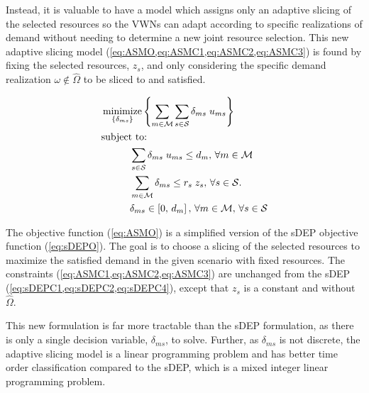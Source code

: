 \documentclass[12pt,dvipsnames]{report}
\DeclareMathOperator*{\argmin}{minimize}
\begin{document}
Instead, it is valuable to have a model which assigns only an adaptive slicing of the selected resources so the VWNs can adapt according to specific realizations of demand without needing to determine a new joint resource selection.  This new adaptive slicing model (\cref{eq:ASMO,eq:ASMC1,eq:ASMC2,eq:ASMC3}) is found by fixing the selected resources, $z_s$, and only considering the specific demand realization $\omega \notin \hat{\Omega}$ to be sliced to and satisfied.

\begin{tcolorbox}[floatplacement = !ht, float, title = Adaptive Slicing Model]
\begin{align}
& \argmin_{\left\{ \delta_{ms} \right\}} \left\{ \sum_{m \in \mathcal{M}} \sum_{s \in \mathcal{S}} \delta_{ms} \; u_{ms} \right\} \label{eq:ASMO}\\
& \text{subject to:}  \nonumber \\
& \hspace{0.4in} \sum_{s \in \mathcal{S}} \delta_{ms} \; u_{ms} \leq d_m,\, \forall m \in \mathcal{M} \label{eq:ASMC1}\\
& \hspace{0.4in} \sum_{m \in \mathcal{M}} \delta_{ms} \leq r_s \; z_s,\, \forall s \in \mathcal{S}. \label{eq:ASMC2}\\
& \hspace{0.4in} \delta_{ms} \in \left[ 0,\, d_m \right],\, \forall m \in \mathcal{M},\, \forall s \in \mathcal{S} \label{eq:ASMC3}
\end{align}
\end{tcolorbox}

The objective function (\cref{eq:ASMO}) is a simplified version of the sDEP objective function (\cref{eq:sDEPO}).  The goal is to choose a slicing of the selected resources to maximize the satisfied demand in the given scenario with fixed resources.  The constraints (\cref{eq:ASMC1,eq:ASMC2,eq:ASMC3}) are unchanged from the sDEP (\cref{eq:sDEPC1,eq:sDEPC2,eq:sDEPC4}), except that $z_s$ is a constant and without $\hat{\Omega}$.

This new formulation is far more tractable than the sDEP formulation, as there is only a single decision variable, $\delta_{ms}$, to solve.  Further, as $\delta_{ms}$ is not discrete, the adaptive slicing model is a linear programming problem and has better time order classification compared to the sDEP, which is a mixed integer linear programming problem.
\end{document}
